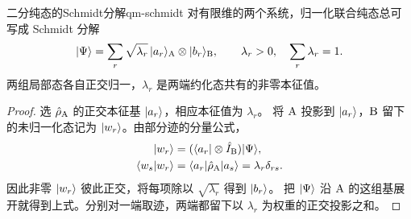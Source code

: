 \begin{theorem}{二分纯态的Schmidt分解}{qm-schmidt}
    对有限维的两个系统，归一化联合纯态总可写成 Schmidt 分解
    \begin{equation}
        \lvert\Psi\rangle = \sum_r\sqrt{\lambda_r}\,\lvert a_r\rangle_{\mathrm{A}} \otimes \lvert b_r\rangle_{\mathrm{B}},
        \qquad \lambda_r > 0,\quad\sum_r\lambda_r = 1.
    \end{equation}
    两组局部态各自正交归一，$\lambda_r$ 是两端约化态共有的非零本征值。
\end{theorem}
\begin{proof}
    选 $\hat{\rho}_{\mathrm{A}}$ 的正交本征基 $\lvert a_r\rangle$，相应本征值为 $\lambda_r$。
    将 $\mathrm{A}$ 投影到 $\lvert a_r\rangle$，$\mathrm{B}$ 留下的未归一化态记为 $\lvert w_r\rangle$。由部分迹的分量公式，
    \begin{subequations}
        \begin{align}
            \lvert w_r\rangle &= (\langle a_r\rvert \otimes \hat{I}_{\mathrm{B}})\lvert\Psi\rangle,\\
            \langle w_s\vert w_r\rangle &= \langle a_r\vert\hat{\rho}_{\mathrm{A}}\vert a_s\rangle = \lambda_r\delta_{rs}.
        \end{align}
    \end{subequations}
    因此非零 $\lvert w_r\rangle$ 彼此正交，将每项除以 $\sqrt{\lambda_r}$ 得到 $\lvert b_r\rangle$。
    把 $\lvert\Psi\rangle$ 沿 $\mathrm{A}$ 的这组基展开就得到上式。分别对一端取迹，两端都留下以 $\lambda_r$ 为权重的正交投影之和。
\end{proof}

